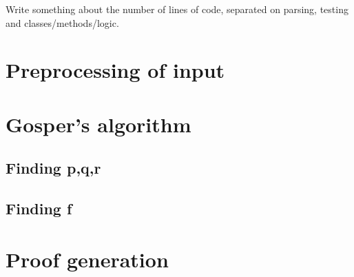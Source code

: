 Write something about the number of lines of code, separated on parsing, testing and classes/methods/logic.
\section{Preprocessing of input}
\section{Gosper's algorithm}
\subsection{Finding p,q,r}
\subsection{Finding f}
\section{Proof generation}
